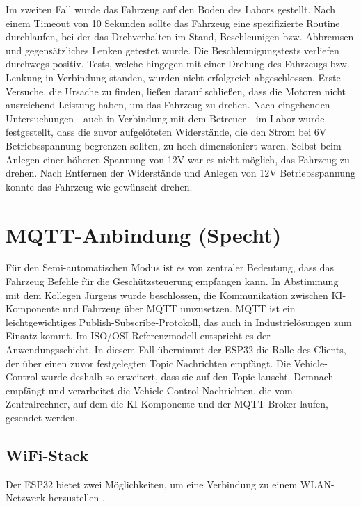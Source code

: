Im zweiten Fall wurde das Fahrzeug auf den Boden des Labors gestellt. Nach einem Timeout von 10 Sekunden sollte das Fahrzeug eine spezifizierte Routine durchlaufen, bei der das Drehverhalten im Stand, Beschleunigen bzw. Abbremsen und gegensätzliches Lenken getestet wurde. Die Beschleunigungstests verliefen durchwegs positiv. Tests, welche hingegen mit einer Drehung des Fahrzeugs bzw. Lenkung in Verbindung standen, wurden nicht erfolgreich abgeschlossen. Erste Versuche, die Ursache zu finden, ließen darauf schließen, dass die Motoren nicht ausreichend Leistung haben, um das Fahrzeug zu drehen. Nach eingehenden Untersuchungen - auch in Verbindung mit dem Betreuer - im Labor wurde festgestellt, dass die zuvor aufgelöteten Widerstände, die den Strom bei 6V Betriebsspannung begrenzen sollten, zu hoch dimensioniert waren. Selbst beim Anlegen einer höheren Spannung von 12V war es nicht möglich, das Fahrzeug zu drehen. Nach Entfernen der Widerstände und Anlegen von 12V Betriebsspannung konnte das Fahrzeug wie gewünscht drehen. \newline

\section{MQTT-Anbindung (Specht)}

Für den Semi-automatischen Modus ist es von zentraler Bedeutung, dass das Fahrzeug Befehle für die Geschützsteuerung empfangen kann. In Abstimmung mit dem Kollegen Jürgens wurde beschlossen, die Kommunikation zwischen KI-Komponente und Fahrzeug über MQTT umzusetzen. MQTT ist ein leichtgewichtiges Publish-Subscribe-Protokoll, das auch in Industrielösungen zum Einsatz kommt. Im ISO/OSI Referenzmodell entspricht es der Anwendungsschicht. In diesem Fall übernimmt der ESP32 die Rolle des Clients, der über einen zuvor festgelegten Topic Nachrichten empfängt. Die Vehicle-Control wurde deshalb so erweitert, dass sie auf den Topic lauscht. Demnach empfängt und verarbeitet die Vehicle-Control Nachrichten, die vom Zentralrechner, auf dem die KI-Komponente und der MQTT-Broker laufen, gesendet werden. \newline

\subsection{WiFi-Stack}

Der ESP32 bietet zwei Möglichkeiten, um eine Verbindung zu einem WLAN-Netzwerk herzustellen \cite{esp32_wifi_getting_started}. \newline

